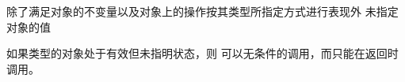 除了满足对象的不变量以及对象上的操作按其类型所指定方式进行表现外
未指定对象的值

\begin{example}[\noindent]
如果类型的对象处于有效但未指明状态，则
可以无条件的调用，而只能在返回时调用。
\end{example}
